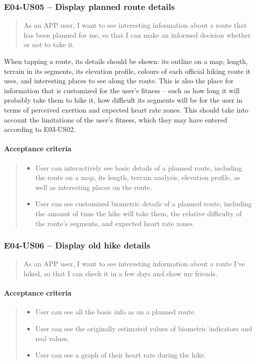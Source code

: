 \subsubsection*{E04-US05 -- Display planned route details}
\begin{quote}
As an APP user, I want to see interesting information about a route that has been planned for me, so that I can make an informed decision whether or not to take it.
\end{quote}

When tapping a route, its details should be shown: its outline on a map, length, terrain in its segments, its elevation profile, colours of each official hiking route it uses, and interesting places to see along the route.
This is also the place for information that is customized for the user's fitness -- such as how long it will probably take them to hike it, how difficult its segments will be for the user in terms of perceived exertion and expected heart rate zones.
This should take into account the limitations of the user's fitness, which they may have entered according to E03-US02.

\paragraph*{Acceptance criteria}
\begin{quote}
\begin{itemize}
    \item User can interactively see basic details of a planned route, including the route on a map, its length, terrain analysis, elevation profile, as well as interesting places on the route.
    \item User can see customized biometric details of a planned route, including the amount of time the hike will take them, the relative difficulty of the route's segments, and expected heart rate zones.
\end{itemize}
\end{quote}

\subsubsection*{E04-US06 -- Display old hike details}
\begin{quote}
As an APP user, I want to see interesting information about a route I've hiked, so that I can check it in a few days and show my friends.
\end{quote}

\paragraph*{Acceptance criteria}
\begin{quote}
\begin{itemize}
    \item User can see all the basic info as on a planned route.
    \item User can see the originally estimated values of biometric indicators and real values.
    \item User can see a graph of their heart rate during the hike.
\end{itemize}
\end{quote}

